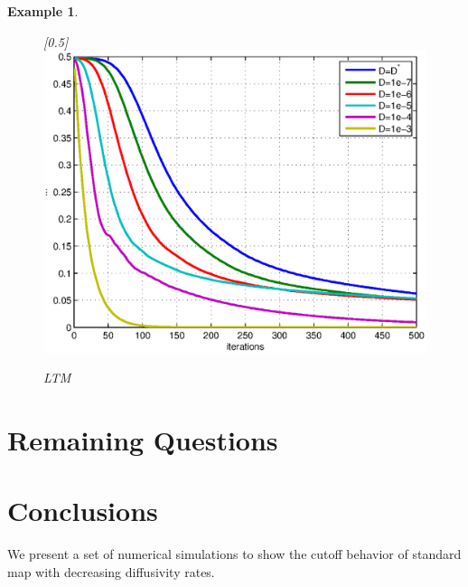 \documentclass{article}
\newtheorem{example}{Example}
\begin{document}
\begin{example}
\begin{figure}
 \centerline{
  \scalebox{0.5}[0.5]{\includegraphics{ltmcutoff.eps}}
  } \caption{LTM}
  \label{LTM}
\end{figure}


\end{example}




\section{Remaining Questions}
\section{Conclusions}
\label{Conclusions}
We present a set of numerical simulations to show the cutoff behavior of standard map with decreasing diffusivity rates.
  


\cite{Wiggins2004}
\cite{Ottino2004}
\cite{Mezic2005}
\cite{Thiffeault2003-13}
\cite{Thiffeault2003-309}
\cite{Thiffeault2004}
\cite{Thiffeault2005}
\cite{Ashwin2002}
\cite{Boyd2004}
\cite{Diaconis1996}
\cite{Diaconis2001}
\cite{Diaconis2005}
\cite{Diaconis1986}
\cite{Hammarstr2005}
\cite{Fereday2002}
\cite{Tsang2005}
\cite{Haynes2005}
\cite{Pierrehumbert2000}
\cite{Percival1989}





\end{document}
